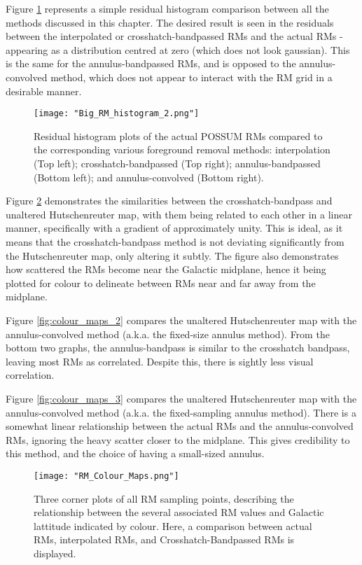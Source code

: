 Figure \ref{fig:big_hist} represents a simple residual histogram comparison between all the methods discussed in this chapter. The desired result is seen in the residuals between the interpolated or crosshatch-bandpassed RMs and the actual RMs - appearing as a distribution centred at zero (which does not look gaussian). This is the same for the annulus-bandpassed RMs, and is opposed to the annulus-convolved method, which does not appear to interact with the RM grid in a desirable manner.

\begin{figure}
    \texttt{[image: "Big\_RM\_histogram\_2.png"]}
    \centering
    \caption{Residual histogram plots of the actual POSSUM RMs compared to the corresponding various foreground removal methods: interpolation (Top left); crosshatch-bandpassed (Top right); annulus-bandpassed (Bottom left); and annulus-convolved (Bottom right).}
    \label{fig:big_hist}
\end{figure}


Figure \ref{fig:colour_maps_1} demonstrates the similarities between the crosshatch-bandpass and unaltered Hutschenreuter map, with them being related to each other in a linear manner, specifically with a gradient of approximately unity. This is ideal, as it means that the crosshatch-bandpass method is not deviating significantly from the Hutschenreuter map, only altering it subtly. The figure also demonstrates how scattered the RMs become near the Galactic midplane, hence it being plotted for colour to delineate between RMs near and far away from the midplane.

Figure \ref{fig:colour_maps_2} compares the unaltered Hutschenreuter map with the annulus-convolved method (a.k.a. the fixed-size annulus method). From the bottom two graphs, the annulus-bandpass is similar to the crosshatch bandpass, leaving most RMs as correlated. Despite this, there is sightly less visual correlation.


Figure \ref{fig:colour_maps_3} compares the unaltered Hutschenreuter map with the annulus-convolved method (a.k.a. the fixed-sampling annulus method). There is a somewhat linear relationship between the actual RMs and the annulus-convolved RMs, ignoring the heavy scatter closer to the midplane. This gives credibility to this method, and the choice of having a small-sized annulus.


\begin{figure}
    \texttt{[image: "RM\_Colour\_Maps.png"]}
    \centering
    \caption{Three corner plots of all RM sampling points, describing the relationship between the several associated RM values and Galactic lattitude indicated by colour. Here, a comparison between actual RMs, interpolated RMs, and Crosshatch-Bandpassed RMs is displayed.}
    \label{fig:colour_maps_1}
\end{figure}

